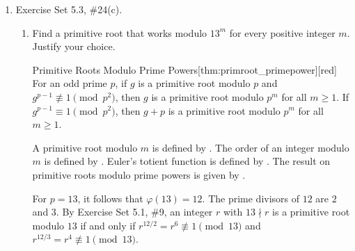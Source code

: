 \begin{enumerate}
\begin{enumerate}
\begin{subprove}
      It is shown that no quadratic residue can be a primitive root.
      If $a$ is a quadratic residue modulo $p$, then by , $a^{(p-1)/2} \equiv 1 \pmod{p}$.
      Since $(p-1)/2 < p-1 = \varphi(p)$, the order of $a$ modulo $p$ divides $(p-1)/2$ and is strictly less than $\varphi(p)$.
      Therefore, by , $a$ is not a primitive root modulo $p$.
      
      Since all primitive roots are quadratic non-residues and no quadratic residue is a primitive root, it follows that the number of quadratic non-residues that are not primitive roots is
      \[
      \frac{p-1}{2} - \varphi(p-1).
      \]
      Therefore, there are exactly $\frac{p-1}{2}-\varphi(p-1)$ incongruent quadratic non-residues modulo $p$ that are not primitive roots modulo $p$.
    \end{subprove}
  \end{enumerate}











  \newpage
  \item Exercise Set 5.3, \#24(c).
  \begin{enumerate}
    \item Find a primitive root that works modulo $13^m$ for every positive integer $m$. 
    Justify your choice.
    \begin{define}{Primitive Roots Modulo Prime Powers}[thm:primroot_primepower][red]
      For an odd prime $p$, if $g$ is a primitive root modulo $p$ and $g^{p-1} \not\equiv 1 \pmod{p^2}$, then $g$ is a primitive root modulo $p^m$ for all $m \geq 1$.
      If $g^{p-1} \equiv 1 \pmod{p^2}$, then $g+p$ is a primitive root modulo $p^m$ for all $m \geq 1$.
    \end{define}
    \begin{subanswer}
      A primitive root modulo $m$ is defined by .
      The order of an integer modulo $m$ is defined by .
      Euler's totient function is defined by .
      The result on primitive roots modulo prime powers is given by .
      
      For $p = 13$, it follows that $\varphi(13) = 12$. The prime divisors of $12$ are $2$ and $3$.
      By Exercise Set 5.1, \#9, an integer $r$ with $13 \nmid r$ is a primitive root modulo $13$ if and only if $r^{12/2} = r^6 \not\equiv 1 \pmod{13}$ and $r^{12/3} = r^4 \not\equiv 1 \pmod{13}$.
      

\end{subanswer}
\end{enumerate}
\end{enumerate}
